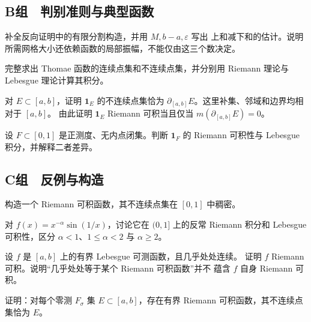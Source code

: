 \subsection*{B组　判别准则与典型函数}
\begin{enumerate}[label=\textbf{\thechapter.\arabic*.},resume]
补全反向证明中的有限分割构造，并用 \(M,b-a,\varepsilon\) 写出
上和减下和的估计。说明所需网格大小还依赖函数的局部振幅，不能仅由这三个数决定。

完整求出 Thomae 函数的连续点集和不连续点集，并分别用 Riemann 理论与
Lebesgue 理论计算其积分。

对 \(E\subset[a,b]\)，证明 \(\mathbf1_E\) 的不连续点集恰为
\(\partial_{[a,b]}E\)。这里补集、邻域和边界均相对于 \([a,b]\)。
由此证明 \(\mathbf1_E\) Riemann 可积当且仅当
\(m(\partial_{[a,b]}E)=0\)。

设 \(F\subset[0,1]\) 是正测度、无内点闭集。判断 \(\mathbf1_F\) 的
Riemann 可积性与 Lebesgue 积分，并解释二者差异。

\end{enumerate}
\subsection*{C组　反例与构造}
\begin{enumerate}[label=\textbf{\thechapter.\arabic*.},resume]
构造一个 Riemann 可积函数，其不连续点集在 \([0,1]\) 中稠密。

对 \(f(x)=x^{-\alpha}\sin(1/x)\)，讨论它在 \((0,1]\) 上的反常 Riemann
积分和 Lebesgue 可积性，区分 \(\alpha<1\)、\(1\le\alpha<2\) 与
\(\alpha\ge2\)。

设 \(f\) 是 \([a,b]\) 上的有界 Lebesgue 可测函数，且几乎处处连续。
证明 \(f\) Riemann 可积。说明“几乎处处等于某个 Riemann 可积函数”并不
蕴含 \(f\) 自身 Riemann 可积。

证明：对每个零测 \(F_\sigma\) 集 \(E\subset[a,b]\)，存在有界 Riemann
可积函数，其不连续点集恰为 \(E\)。
\end{enumerate}

